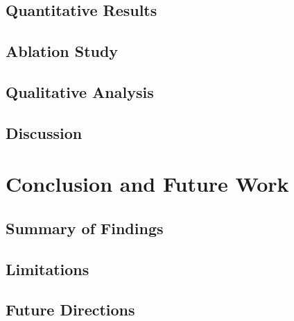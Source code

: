 \documentclass[sigconf]{acmart}
\begin{document}
\subsection{Quantitative Results}
\subsection{Ablation Study}
\subsection{Qualitative Analysis}
\subsection{Discussion}

\section{Conclusion and Future Work}
\label{sec:conclusion}
\subsection{Summary of Findings}
\subsection{Limitations}
\subsection{Future Directions}

\begin{acks}
\end{acks}



\end{document}
